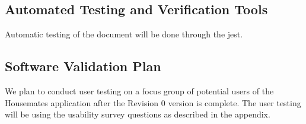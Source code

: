 \documentclass[12pt, titlepage]{article}
\begin{document}
\subsection{Automated Testing and Verification Tools}

Automatic testing of the document will be done through the jest.




\subsection{Software Validation Plan}

We plan to conduct user testing on a focus group of potential users of the Housemates application after the Revision 0 version is complete. The user testing will be using the usability survey questions as described in the appendix.




\end{document}
